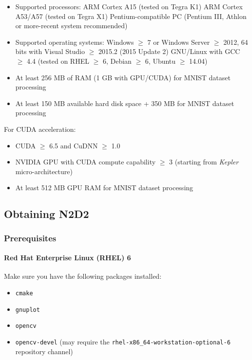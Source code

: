 \documentclass[a4paper,11pt,oneside]{article}
\newenvironment{myitemize}
{ \begin{itemize}
    \setlength{\itemsep}{0pt}
    \setlength{\parskip}{0pt}
    \setlength{\parsep}{0pt}     }
{ \end{itemize}                  }
\begin{document}
\begin{myitemize}
    \item Supported processors:
        \subitem ARM Cortex A15 (tested on Tegra K1)
        \subitem ARM Cortex A53/A57 (tested on Tegra X1)
        \subitem Pentium-compatible PC (Pentium III, Athlon or more-recent system recommended)
    \item Supported operating systems:
        \subitem Windows $\geq$ 7 or Windows Server $\geq$ 2012, 64 bits with Visual Studio $\geq$ 2015.2 (2015 Update 2)
        \subitem GNU/Linux with GCC $\geq$ 4.4 (tested on RHEL $\geq$ 6, Debian $\geq$ 6, Ubuntu $\geq$ 14.04)
    \item At least 256 MB of RAM (1 GB with GPU/CUDA) for MNIST dataset processing
    \item At least 150 MB available hard disk space + 350 MB for MNIST dataset processing
\end{myitemize}

For CUDA acceleration:

\begin{myitemize}
    \item CUDA $\geq$ 6.5 and CuDNN $\geq$ 1.0
    \item NVIDIA GPU with CUDA compute capability $\geq$ 3 (starting from \emph{Kepler} micro-architecture)
    \item At least 512 MB GPU RAM for MNIST dataset processing
\end{myitemize}


\subsection{Obtaining N2D2}

\subsubsection{Prerequisites}

\paragraph{Red Hat Enterprise Linux (RHEL) 6}

Make sure you have the following packages installed:
\begin{myitemize}
    \item \lstinline!cmake!
    \item \lstinline!gnuplot!
    \item \lstinline!opencv!
    \item \lstinline!opencv-devel! (may require the
    \lstinline!rhel-x86_64-workstation-optional-6! repository channel)
\end{myitemize}
\end{document}
